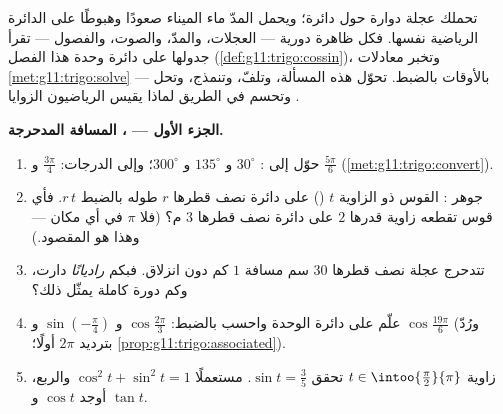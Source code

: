 \begin{problem}
\label{pb:g11:trigo:1}
تحملك عجلة دوارة حول دائرة؛ ويحمل المدّ ماء
الميناء صعودًا وهبوطًا على الدائرة الرياضية نفسها. فكل
ظاهرة دورية --- العجلات، والمدّ، والصوت، والفصول --- تقرأ
جدولها على دائرة وحدة هذا الفصل
(\cref{def:g11:trigo:cossin})، وتخبر معادلات
\cref{met:g11:trigo:solve} بالأوقات بالضبط. تحوّل هذه المسألة، وتلفّ، وتنمذج، وتحل ---
وتحسم في الطريق لماذا
يقيس الرياضيون الزوايا .

\medskip
\noindent\textbf{الجزء الأول --- ، المسافة المدحرجة.}
\begin{enumerate}
  \item حوّل إلى : $30^\circ$ و $135^\circ$ و
        $300^\circ$؛ وإلى الدرجات: $\frac{3\pi}{4}$ و
        $\frac{5\pi}{6}$ (\cref{met:g11:trigo:convert}).
  \item جوهر : القوس ذو الزاوية $t$ ()
        على دائرة نصف قطرها $r$ طوله بالضبط
        $r\,t$. فأي قوس تقطعه زاوية قدرها $2$  على
        دائرة نصف قطرها $3$ م؟ (فلا $\pi$ في أي مكان --- وهذا هو
        المقصود.)
  \item تتدحرج عجلة نصف قطرها $30$ سم مسافة $1$ كم دون
        انزلاق. فبكم \emph{راديانًا} دارت،
        وكم دورة كاملة يمثّل ذلك؟
  \item علّم على دائرة الوحدة واحسب بالضبط:
        $\cos\frac{2\pi}{3}$ و $\sin\left(-\frac{\pi}{4}\right)$
        و $\cos\frac{19\pi}{6}$ (ورُدّ بترديد $2\pi$ أولًا؛
        \cref{prop:g11:trigo:associated}).
  \item زاوية $t \in \intoo{\frac\pi2}{\pi}$ تحقق
        $\sin t = \frac35$. مستعملًا
        $\cos^2 t + \sin^2 t = 1$ والربع، أوجد
        $\cos t$ و $\tan t$.
\end{enumerate}


\end{problem}
